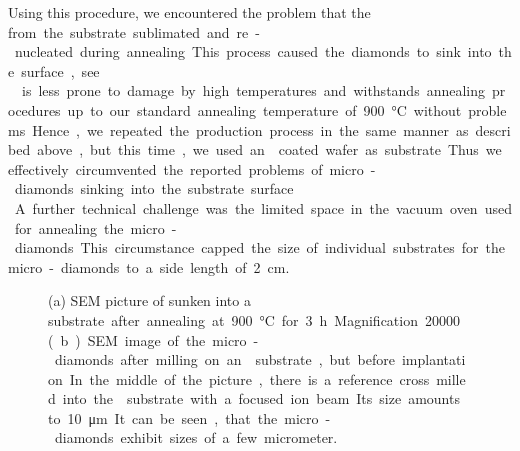 		Using this procedure, we encountered the problem that the \si from the substrate sublimated and re-nucleated during annealing.
		This process caused the diamonds to sink into the \si surface, see .
		\\
		\Ir is less prone to damage by high temperatures and withstands annealing procedures up to our standard annealing temperature of \SI{900}{\celsius} without problems.
		Hence, we repeated the production process in the same manner as described above, but this time, we used an \ir coated \si wafer as substrate.
		Thus we effectively circumvented the reported problems of micro-diamonds sinking into the substrate surface.
		\\
		A further technical challenge was the limited space in the vacuum oven used for annealing the micro-diamonds.
		This circumstance capped the size of individual substrates for the micro-diamonds to a side length of \SI{2}{cm}.

		\begin{figure}[!htb]
			\begin{subfigure}[t]{ 0.49\linewidth}
				\centering
				\caption{}\label{subfig::sunken_nd}
			\end{subfigure}
			\hfill
			\begin{subfigure}[t]{ 0.49\linewidth}
				\centering
				\caption{}\label{subfig::microdiamonds}
			\end{subfigure}
			\caption[SEM images of micro and nanodiamonds]{(a) SEM picture of \nds sunken into a \si substrate after annealing at \SI{900}{\celsius} for \SI{3}{h}. Magnification \num{20000}. (b) SEM image of the micro-diamonds after milling on an \ir substrate, but before implantation. In the middle of the picture, there is a reference cross milled into the \ir substrate with a focused ion beam. Its size amounts to \SI{10}{\micro\meter}. It can be seen, that the micro-diamonds exhibit sizes of a few micrometer.}
		\end{figure}

